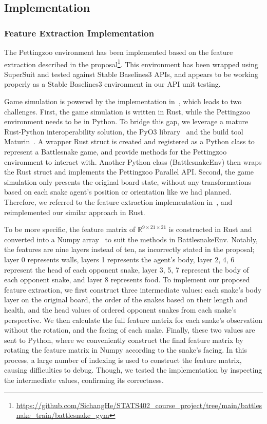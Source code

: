 \documentclass[conference]{IEEEtran}
\begin{document}
\subsection{Implementation}

\subsubsection{Feature Extraction Implementation}

The Pettingzoo environment has been implemented based on the feature extraction
described in the
proposal\footnote{\url{https://github.com/SichangHe/STATS402_course_project/tree/main/battlesnake_train/battlesnake_gym}}.
This environment has been wrapped using SuperSuit and tested against Stable
Baselines3 APIs,
and appears to be working properly as a Stable Baselines3 environment in our API
unit testing.

Game simulation is powered by the implementation in~\cite{wrenger2024rusty},
which leads to two challenges. First, the game simulation is written in Rust,
while the Pettingzoo environment needs to be in Python. To bridge this gap,
we leverage a mature Rust-Python interoperability solution,
the PyO3 library~\cite{pyo3} and the build tool Maturin~\cite{maturin}.
A wrapper Rust struct is created and registered as a Python class to represent a
Battlesnake game,
and provide methods for the Pettingzoo environment to interact with.
Another Python class (\textsf{BattlesnakeEnv})
then wraps the Rust struct and implements the Pettingzoo Parallel API. Second,
the game simulation only presents the original board state,
without any transformations based on each snake agent's position or orientation
like we had planned. Therefore,
we referred to the feature extraction implementation
in~\cite{siddiqui2020multiagent},
and reimplemented our similar approach in Rust.

To be more specific,
the feature matrix of $\mathbb R^{9\times21\times21}$ is constructed in Rust and
converted into a Numpy array~\cite{harris2020array}
to suit the methods in \textsf{BattlesnakeEnv}. Notably,
the features are nine layers instead of ten,
as incorrectly stated in the proposal; layer 0 represents walls,
layers 1 represents the agent's body, layer 2, 4,
6 represent the head of each opponent snake, layer 3, 5,
7 represent the body of each opponent snake, and layer 8 represents food.
To implement our proposed feature extraction,
we first construct three intermediate values:
each snake's body layer on the original board,
the order of the snakes based on their length and health,
and the head values of ordered opponent snakes from each snake's perspective.
We then calculate the full feature matrix for each snake's observation without
the rotation, and the facing of each snake. Finally,
these two values are sent to Python,
where we conveniently construct the final feature matrix by rotating the feature
matrix in Numpy according to the snake's facing. In this process,
a large number of indexing is used to construct the feature matrix,
causing difficulties to debug. Though,
we tested the implementation by inspecting the intermediate values,
confirming its correctness.
\end{document}
